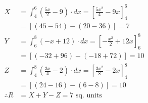 \documentclass[14pt,fleqn]{extarticle}
\begin{document}
\newcard 

\begin{align}
X &= \int_4^6\left(\frac{5x}{2}-9\right)\cdot dx  
=\left[ \frac{5x^2}{4}-9x \right]_4^6 \\
&= \left[ \left(45-54\right)-\left(20-36\right) \right] =  7 \\
Y &= \int_6^8(-x+12)\cdot dx = \left[-\frac{x^2}{2}+12x \right]_6^8 \\
&=  \left[ \left(-32+96\right)-\left(-18+72\right) \right] =10 \\
Z &= \int_4^8\left( \frac{3x}{4}-2\right)\cdot dx = \left[ \frac{3x^2}{8}-2x\right]_4^8 \\
&=  \left[ \left(24 -16\right)-\left(6-8\right) \right] = 10 \\
\therefore R &= X+Y-Z = 7\text{ sq. units}
\end{align}
\end{document}
